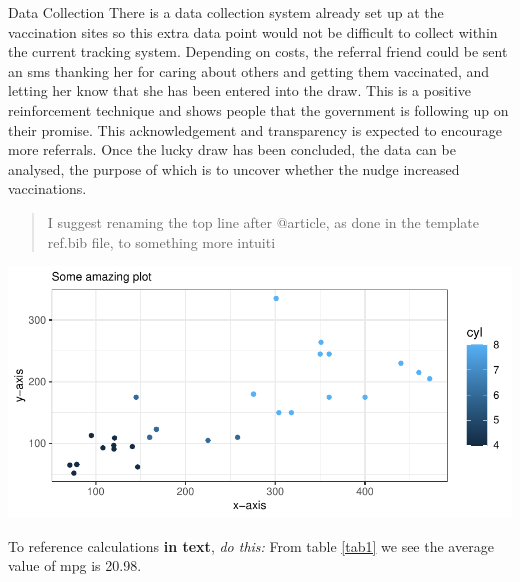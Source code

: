 \documentclass[11pt,preprint, authoryear]{elsarticle}
\let\origfigure\figure
\let\endorigfigure\endfigure
\renewenvironment{figure}[1][2] {
    \expandafter\origfigure\expandafter[H]
} {
    \endorigfigure
}
\numberwithin{equation}{section}
\numberwithin{figure}{section}
\numberwithin{table}{section}
\begin{document}
Data Collection There is a data collection system already set up at the
vaccination sites so this extra data point would not be difficult to
collect within the current tracking system. Depending on costs, the
referral friend could be sent an sms thanking her for caring about
others and getting them vaccinated, and letting her know that she has
been entered into the draw. This is a positive reinforcement technique
and shows people that the government is following up on their promise.
This acknowledgement and transparency is expected to encourage more
referrals. Once the lucky draw has been concluded, the data can be
analysed, the purpose of which is to uncover whether the nudge increased
vaccinations.

\begin{quote}
I suggest renaming the top line after @article, as done in the template
ref.bib file, to something more intuiti
\end{quote}

\begin{figure}[H]

{\centering \includegraphics{Write_Up_files/figure-latex/Figure1-1} 

}

\caption{Caption Here \label{Figure1}}\label{fig:Figure1}
\end{figure}

To reference calculations \textbf{in text}, \emph{do this:} From table
\ref{tab1} we see the average value of mpg is 20.98.
\end{document}
